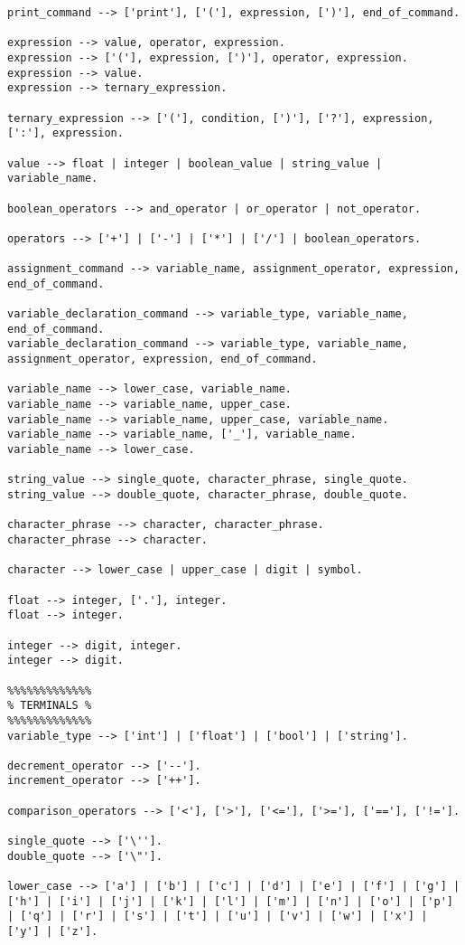 \documentclass[12pt,letterpaper]{article}
\begin{document}
\begin{verbatim}
print_command --> ['print'], ['('], expression, [')'], end_of_command.

expression --> value, operator, expression.
expression --> ['('], expression, [')'], operator, expression.
expression --> value.
expression --> ternary_expression.

ternary_expression --> ['('], condition, [')'], ['?'], expression, [':'], expression.

value --> float | integer | boolean_value | string_value | variable_name.

boolean_operators --> and_operator | or_operator | not_operator.

operators --> ['+'] | ['-'] | ['*'] | ['/'] | boolean_operators.

assignment_command --> variable_name, assignment_operator, expression, end_of_command.

variable_declaration_command --> variable_type, variable_name, end_of_command.
variable_declaration_command --> variable_type, variable_name, assignment_operator, expression, end_of_command.

variable_name --> lower_case, variable_name.
variable_name --> variable_name, upper_case.
variable_name --> variable_name, upper_case, variable_name.
variable_name --> variable_name, ['_'], variable_name.
variable_name --> lower_case.

string_value --> single_quote, character_phrase, single_quote.
string_value --> double_quote, character_phrase, double_quote.

character_phrase --> character, character_phrase.
character_phrase --> character.

character --> lower_case | upper_case | digit | symbol.

float --> integer, ['.'], integer.
float --> integer.

integer --> digit, integer.
integer --> digit.

%%%%%%%%%%%%%
% TERMINALS %
%%%%%%%%%%%%%
variable_type --> ['int'] | ['float'] | ['bool'] | ['string'].

decrement_operator --> ['--'].
increment_operator --> ['++'].

comparison_operators --> ['<'], ['>'], ['<='], ['>='], ['=='], ['!='].

single_quote --> ['\''].
double_quote --> ['\"'].

lower_case --> ['a'] | ['b'] | ['c'] | ['d'] | ['e'] | ['f'] | ['g'] | ['h'] | ['i'] | ['j'] | ['k'] | ['l'] | ['m'] | ['n'] | ['o'] | ['p'] | ['q'] | ['r'] | ['s'] | ['t'] | ['u'] | ['v'] | ['w'] | ['x'] | ['y'] | ['z'].


\end{verbatim}
\end{document}
